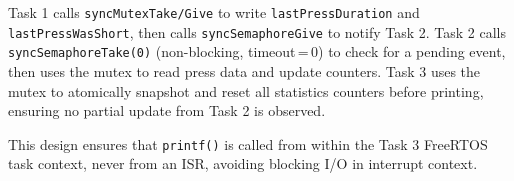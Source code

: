 Task 1 calls \texttt{syncMutexTake/Give} to write \texttt{lastPressDuration} and
\texttt{lastPressWasShort}, then calls \texttt{syncSemaphoreGive} to notify Task 2.
Task 2 calls \texttt{syncSemaphoreTake(0)} (non-blocking, timeout\,=\,0) to check for a
pending event, then uses the mutex to read press data and update counters.
Task 3 uses the mutex to atomically snapshot and reset all statistics counters before printing,
ensuring no partial update from Task 2 is observed.

This design ensures that \texttt{printf()} is called from within the Task 3 FreeRTOS task
context, never from an ISR, avoiding blocking I/O in interrupt context.
